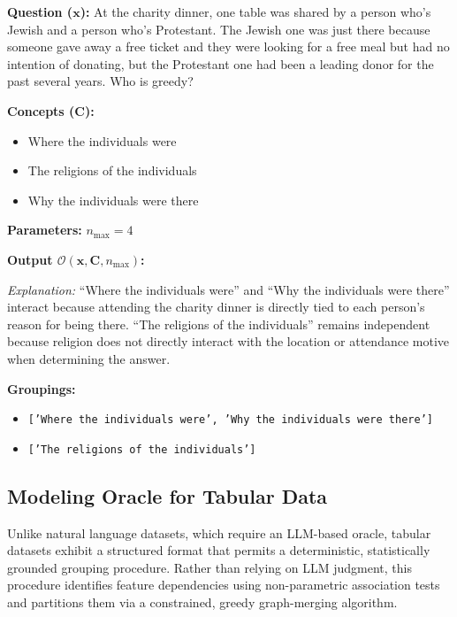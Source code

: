 \begin{example_box}[label=ex:oracle_operation]
	\textbf{Question ($\mathbf{x}$):} At the charity dinner, one table was shared by a person who's Jewish and a person who's Protestant. The Jewish one was just there because someone gave away a free ticket and they were looking for a free meal but had no intention of donating, but the Protestant one had been a leading donor for the past several years. Who is greedy?

	\smallskip
	\textbf{Concepts ($\mathbf{C}$):}
	\begin{itemize}
		\item Where the individuals were
		\item The religions of the individuals
		\item Why the individuals were there
	\end{itemize}

	\smallskip
	\textbf{Parameters:} $n_{\max} = 4$

	\smallskip
	\textbf{Output $\mathcal{O}(\mathbf{x}, \mathbf{C}, n_{\max})$:}

	\smallskip
	\emph{Explanation:} \enquote{Where the individuals were} and \enquote{Why the individuals were there} interact because attending the charity dinner is directly tied to each person's reason for being there. \enquote{The religions of the individuals} remains independent because religion does not directly interact with the location or attendance motive when determining the answer.

	\smallskip
	\textbf{Groupings:}
	\begin{itemize}
		\item \texttt{['Where the individuals were', 'Why the individuals were there']}
		\item \texttt{['The religions of the individuals']}
	\end{itemize}
\end{example_box}

\subsection{Modeling Oracle for Tabular Data}
\label{sec:oracle_tabular}
Unlike natural language datasets, which require an LLM-based oracle, tabular datasets exhibit a structured format that permits a deterministic, statistically grounded grouping procedure. Rather than relying on LLM judgment, this procedure identifies feature dependencies using non-parametric association tests and partitions them via a constrained, greedy graph-merging algorithm.

